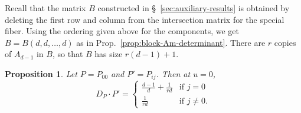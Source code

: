 \documentclass[reqno]{amsart}
\newtheorem{proposition}[thm]{Proposition}
\theoremstyle{definition}
\theoremstyle{remark}
\begin{document}
Recall that the matrix $B$ constructed in \S~\ref{sec:auxiliary-results} is obtained by deleting the first row and column from the intersection matrix for the special fiber. Using the ordering given above for the components, we get $B = B(d, d, \dots, d)$ as in Prop.~\ref{prop:block-Am-determinant}. There are $r$ copies of $A_{d-1}$ in $B$, so that $B$ has size $r(d-1) + 1$.

\begin{proposition}\label{prop:dp-u-zero}
  Let $P = P_{00}$ and $P' = P_{ij}$. Then at $u = 0$,
\[
D_P \cdot P' =
\begin{cases}
  \frac{d-1}{d} + \frac{1}{rd} & \text{if } j = 0 \\
  \frac{1}{rd} & \text{if } j \neq 0.
\end{cases}
\]
\end{proposition}
\end{document}
